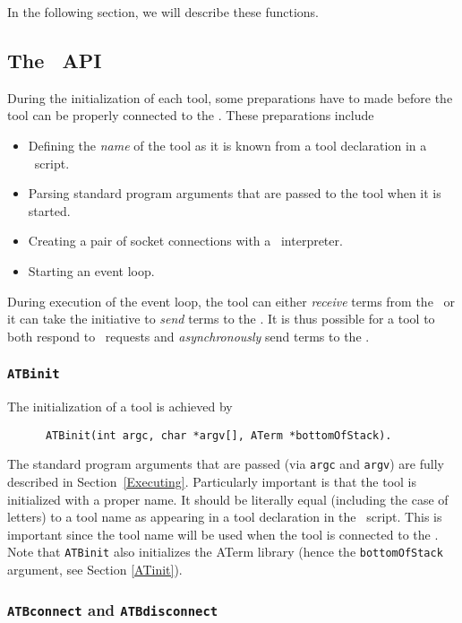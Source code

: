 \documentclass[twoside]{article} %
\begin{document}
In the following section, we will describe these functions.


\subsection{\label{ToolBusAPI}The \TB\ API}

During the initialization of each tool, some preparations have to made
before the tool can be properly connected to the \TB. These preparations
include
\begin{itemize}
\item Defining the {\em name} of the tool as it is known from a tool declaration
in a \T\ script.
\item Parsing standard program arguments that are passed to the tool
when it is started.
\item Creating a pair of socket connections with a \TB\ interpreter.
\item Starting an event loop.
\end{itemize}

During execution of the event loop, the tool can either \emph{receive} terms from
the \TB\ or it can take the initiative to \emph{send} terms to the \TB.
It is thus possible for a tool to both respond to \TB\ requests
and \emph{asynchronously} send terms to the \TB.

\subsubsection{\label{ATBinit}{\tt ATBinit}}

The initialization of a tool is achieved by
\begin{verbatim}
      ATBinit(int argc, char *argv[], ATerm *bottomOfStack).
\end{verbatim}

The standard program arguments that are passed (via {\tt argc} and {\tt argv})
are fully described in Section~\ref{Executing}. Particularly important is that
the tool is initialized with a proper name.  It should be literally equal
(including the case of letters) to a tool name as appearing in a tool
declaration in the \T\ script. This is important since the tool name will be
used when the tool is connected to the \TB. Note that {\tt ATBinit} also
initializes the ATerm library (hence the {\tt bottomOfStack} argument, see Section
\ref{ATinit}).

\subsubsection{\label{ATBconnect}{\tt ATBconnect} and {\tt ATBdisconnect}}
\end{document}
